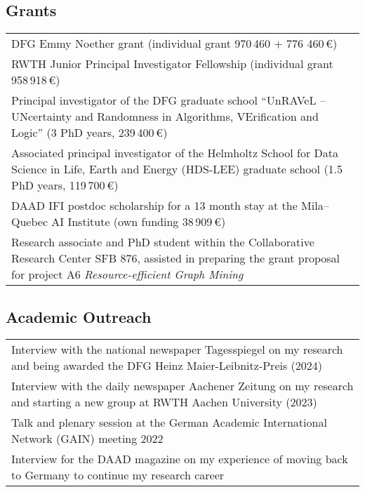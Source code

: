 \documentclass[11pt, a4paper, DIV=14, headings=small]{scrartcl}
\begin{document}
	\subsection*{Grants}
	\begin{tabular}{p{14.5cm}} 
		DFG Emmy Noether grant (individual grant 970\,460 + 776 460\,€)\\   
	
		RWTH Junior Principal Investigator Fellowship (individual grant 958\,918\,€)  \\
		 	
		Principal investigator of the DFG graduate school ``UnRAVeL -- UNcertainty and Randomness in Algorithms, VErification and Logic''  (3 PhD years, 239\,400\,€) \\
				
		Associated principal investigator of the Helmholtz School for Data Science in Life, Earth and Energy (HDS-LEE) graduate school (1.5 PhD years, 119\,700\,€) \\
		
		DAAD IFI postdoc scholarship for a 13 month stay at the Mila--Quebec AI Institute (own funding 38\,909\,€) \\
		
		Research associate and PhD student  within the Collaborative Research Center SFB 876, assisted in preparing the  grant proposal for project A6 \emph{Resource-efficient Graph Mining}\\
	\end{tabular}
	
	\subsection*{Academic Outreach}
	\begin{tabular}{p{14.5cm}}	
	Interview with the national newspaper Tagesspiegel on my research and being awarded the DFG Heinz Maier-Leibnitz-Preis (2024) \\		
	
		Interview with the daily newspaper Aachener Zeitung on my research and starting a new group at RWTH Aachen University (2023)\\	
		Talk and plenary session at the German Academic International Network (GAIN) meeting 2022 \\
		
		Interview for the DAAD magazine on my experience of moving back to Germany to continue my research career
	\end{tabular}
	
\end{document}

